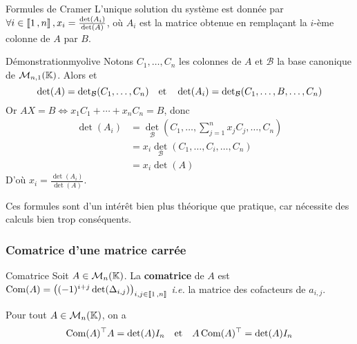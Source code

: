     \begin{prop}{Formules de Cramer}{}
        L’unique solution du système est donnée par $\forall i \in \left\llbracket 1 \, , n \right\rrbracket, x_i = \frac{\operatorname{det}(A_i)}{\operatorname{det}(A)}$, où $A_i$ est la matrice obtenue en remplaçant la $i$-ème colonne de $A$ par $B$.
    \end{prop}

    \begin{demo}{Démonstration}{myolive}
        Notons $C_1, \ldots, C_n$ les colonnes de $A$ et $\mathcal{B}$ la base canonique de $\mathcal{M}_{n,1}(\mathbb{K})$. Alors et \[ \operatorname{det}(A) = \operatorname{det}_{\mathcal{B}}(C_1,\ldots,C_n) \quad \text{et} \quad \operatorname{det}(A_i) = \operatorname{det}_{\mathcal{B}}(C_1, \ldots, B, \ldots, C_n) \]
        Or $AX = B \iff x_1 C_1 + \cdots + x_n C_n = B$, donc 
        \begin{align*}
            \det(A_i) 
            &= \det_{\mathcal{B}}\left(C_1, \ldots, \sum_{j=1}^n x_j C_j, \ldots, C_n\right) \\
            &= x_i \det_{\mathcal{B}}\left(C_1, \ldots, C_i, \ldots, C_n\right) \\
            &= x_i \det(A)
        \end{align*}
        D’où $x_i = \frac{\det(A_i)}{\det(A)}$.
    \end{demo}

    Ces formules sont d’un intérêt bien plus théorique que pratique, car nécessite des calculs bien trop conséquents.

    \subsubsection{Comatrice d’une matrice carrée}

    \begin{defi}{Comatrice}{}
        Soit $A \in \mathcal{M}_{n}(\mathbb{K})$. La \textbf{comatrice} de $A$ est $\operatorname{Com}(A) = \left((-1)^{i + j} \operatorname{det}(\Delta_{i,j})\right)_{i,j \in \left\llbracket 1 \, , n \right\rrbracket}$ \textit{i.e.} la matrice des cofacteurs de $a_{i,j}$.
    \end{defi}

    \begin{prop}{}{}
        Pour tout $A \in \mathcal{M}_{n}(\mathbb{K})$, on a 
        \[ \operatorname{Com}(A)^{\top} A = \operatorname{det}(A) I_n \quad \text{et} \quad A \operatorname{Com}(A)^{\top} = \operatorname{det}(A) I_n \]
    \end{prop}


